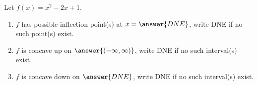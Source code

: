 \documentclass{ximera}
\author{Gregory Hartman \and Matthew Carr}
\begin{document}
\begin{exercise}




Let $f(x)=x^2-2x+1$. 
\begin{enumerate}
\item		$f$ has possible inflection point(s) at $x=\answer{DNE}$, write DNE if no such point(s) exist.
\item		$f$ is concave up on $\answer{(-\infty,\infty)}$, write DNE if no such interval(s) exist.
\item		$f$ is concave down on $\answer{DNE}$, write DNE if no such interval(s) exist.
\end{enumerate}

\end{exercise}
\end{document}
